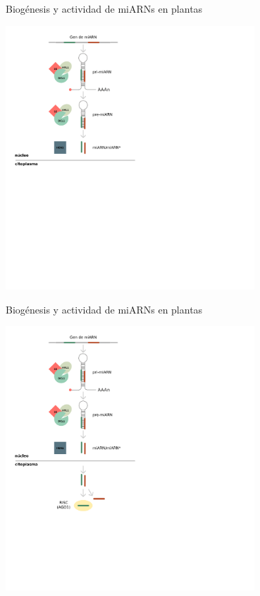 \documentclass{beamer}
\begin{document}
\begin{frame}{Biogénesis y actividad de miARNs en plantas}
	\begin{center}
		\includegraphics[width=0.7\textwidth]{img/biogenesis_accion_defensa03.png}
	\end{center}
\end{frame}

\begin{frame}{Biogénesis y actividad de miARNs en plantas}
	\begin{center}
		\includegraphics[width=0.7\textwidth]{img/biogenesis_accion_defensa04.png}
	\end{center}
\end{frame}
\end{document}
